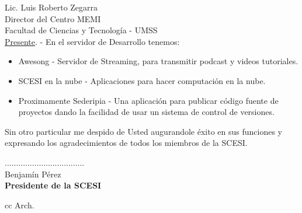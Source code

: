 \documentclass[letterpaper,12pt]{letter}
\begin{document}
\begin{letter}{Lic. Luis Roberto Zegarra \\ Director del Centro MEMI \\ Facultad de Ciencias y Tecnolog\'ia - UMSS \\ \underline {Presente}. -}
En el servidor de Desarrollo tenemos:

\begin{itemize}
    \item Awesong - Servidor de Streaming, para transmitir podcast y videos tutoriales.
    \item SCESI en la nube - Aplicaciones para hacer computaci\'on en la nube.
    \item Proximamente Sederipia - Una aplicaci\'on para publicar c\'odigo fuente de proyectos dando la 
    facilidad de usar un sistema de control de versiones.
\end{itemize}

Sin otro particular me despido de Usted augurandole \'exito en sus funciones y expresando los 
agradecimientos de todos los miembros de la SCESI.

\vspace{6cm}

\begin{center}
...................................\\
Benjam\'in P\'erez\\
{\bfseries Presidente de la  SCESI}
\end{center}
\vspace{2cm}
cc Arch.
\end{letter}
\end{document}
